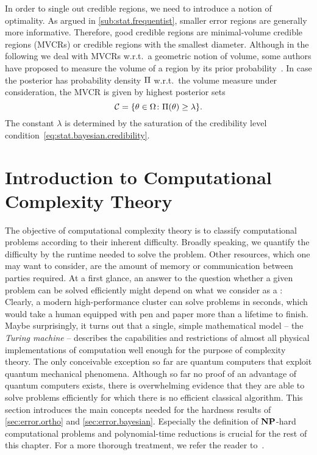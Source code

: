 In order to single out  credible regions, we need to introduce a notion of optimality.
As argued in \cref{sub:stat.frequentist}, smaller error regions are generally more informative.
Therefore, good credible regions are minimal-volume credible regions (MVCRs) or credible regions with the smallest diameter.
Although in the following we deal with MVCRs w.r.t.\ a geometric notion of volume, some authors have proposed to measure the volume of a region by its prior probability~\cite{Evans_2006_Optimally,Shang_2013_Optimal}.
In case the posterior has probability density $\Pi$ w.r.t.\ the volume measure under consideration, the MVCR is given by highest posterior sets~\cite{Ferrie_2014_High}
\[
  \label{eq:stat.bayesian.mvcr}
  \mathcal{C} = \{ \theta \in \Omega\colon \Pi(\theta) \ge \lambda \}.
\]
The constant $\lambda$ is determined by the saturation of the credibility level condition~\eqref{eq:stat.bayesian.credibility}.




\section{Introduction to Computational Complexity Theory}%
\label{sec:error.complexity}

The objective of computational complexity theory is to classify computational problems according to their inherent difficulty.
Broadly speaking, we quantify the difficulty by the runtime needed to solve the problem.
Other resources, which one may want to consider, are the amount of memory or communication between parties required.
At a first glance, an answer to the question whether a given problem can be solved efficiently might depend on what we consider as a :
Clearly, a modern high-performance cluster can solve problems in seconds, which would take a human equipped with pen and paper more than a lifetime to finish.
Maybe surprisingly, it turns out that a single, simple mathematical model -- the \emph{Turing machine} -- describes the capabilities and restrictions of almost all physical implementations of computation well enough for the purpose of complexity theory.
The only conceivable exception so far are quantum computers that exploit quantum mechanical phenomena.
Although so far no proof of an advantage of quantum computers exists, there is overwhelming evidence that they are able to solve problems efficiently for which there is no efficient classical algorithm.
This section introduces the main concepts needed for the hardness results of \cref{sec:error.ortho} and \ref{sec:error.bayesian}.
Especially the definition of $\mathbf{NP}$-hard computational problems and polynomial-time reductions is crucial for the rest of this chapter.
For a more thorough treatment, we refer the reader to~\cite{Arora_2009_Computational,Garey_2002_Computers}.

